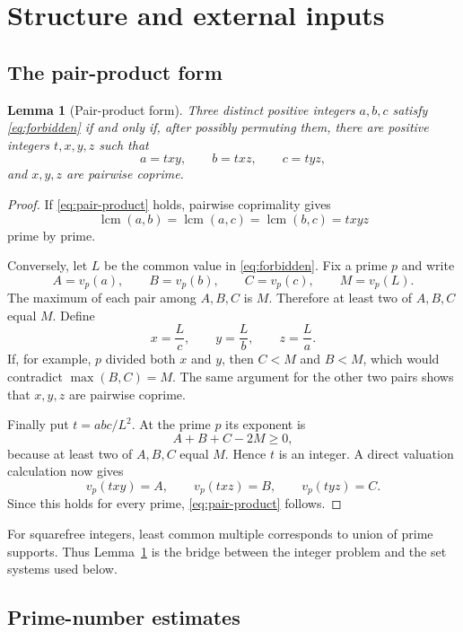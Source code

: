 \documentclass[11pt]{article}
\numberwithin{equation}{section}
\theoremstyle{plain}
\newtheorem{lemma}[theorem]{Lemma}
\newcommand{\1}{\mathbf 1}
\newcommand{\lcm}{\operatorname{lcm}}
\begin{document}
\section{Structure and external inputs}\label{sec:structure}

\subsection{The pair-product form}

\begin{lemma}[Pair-product form]\label{lem:pair-product}
Three distinct positive integers $a,b,c$ satisfy \eqref{eq:forbidden} if
and only if, after possibly permuting them, there are positive integers
$t,x,y,z$ such that
\begin{equation}\label{eq:pair-product}
 a=txy,\qquad b=txz,\qquad c=tyz,
\end{equation}
and $x,y,z$ are pairwise coprime.
\end{lemma}

\begin{proof}
If \eqref{eq:pair-product} holds, pairwise coprimality gives
\[
 \lcm(a,b)=\lcm(a,c)=\lcm(b,c)=txyz
\]
prime by prime.

Conversely, let $L$ be the common value in \eqref{eq:forbidden}.  Fix a
prime $p$ and write
\[
 A=v_p(a),\qquad B=v_p(b),\qquad C=v_p(c),\qquad M=v_p(L).
\]
The maximum of each pair among $A,B,C$ is $M$.  Therefore at least two of
$A,B,C$ equal $M$.  Define
\[
 x=\frac{L}{c},\qquad y=\frac{L}{b},\qquad z=\frac{L}{a}.
\]
If, for example, $p$ divided both $x$ and $y$, then $C<M$ and $B<M$, which
would contradict $\max(B,C)=M$.  The same argument for the other two pairs
shows that $x,y,z$ are pairwise coprime.

Finally put $t=abc/L^2$.  At the prime $p$ its exponent is
\[
 A+B+C-2M\ge0,
\]
because at least two of $A,B,C$ equal $M$.  Hence $t$ is an integer.  A
direct valuation calculation now gives
\[
 v_p(txy)=A,\qquad v_p(txz)=B,\qquad v_p(tyz)=C.
\]
Since this holds for every prime, \eqref{eq:pair-product} follows.
\end{proof}

For squarefree integers, least common multiple corresponds to union of
prime supports.  Thus Lemma~\ref{lem:pair-product} is the bridge between the
integer problem and the set systems used below.

\subsection{Prime-number estimates}
\end{document}
